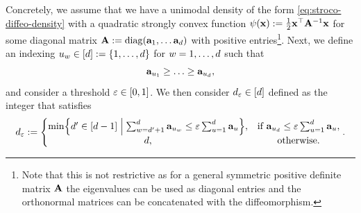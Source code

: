     Concretely, we assume that we have a unimodal density of the form \ref{eq:stroco-diffeo-density} with a quadratic strongly convex function $\psi(\mathbf{x}):= \frac{1}{2} \mathbf{x}^{\top} \mathbf{A}^{-1} \mathbf{x}$ for some diagonal matrix $\mathbf{A}:= \operatorname{diag}(\mathbf{a}_1, \ldots \mathbf{a}_d)$ with positive entries\footnote{Note that this is not restrictive as for a general symmetric positive definite matrix $\mathbf{A}$ the eigenvalues can be used as diagonal entries and the orthonormal matrices can be concatenated with the diffeomorphism.}. Next, we define an indexing $u_w \in [d]:= \{1, \ldots, d\}$ for $w = 1, \ldots, d$ such that
    \begin{equation}
        \mathbf{a}_{u_1}\geq \ldots \geq \mathbf{a}_{u_d},
    \end{equation}
    and consider a threshold $\varepsilon\in [0,1]$. We then consider $d_\varepsilon \in [d]$ defined as the integer that satisfies
    \begin{equation}
        d_\varepsilon := \left\{\begin{matrix}
     \min \Bigl\{ d'\in [d-1] \; \Bigl\vert \; \sum_{w=d' + 1}^{d} \mathbf{a}_{u_w}  \leq \varepsilon \sum_{u=1}^{d} \mathbf{a}_{u} \Bigr\}, & \text{if } \mathbf{a}_{u_d}  \leq \varepsilon \sum_{u=1}^{d} \mathbf{a}_{u}, \\
     d, & \text{otherwise.} \\
    \end{matrix}\right.  .
    \label{eq:dimind-epsilon}
    \end{equation}

